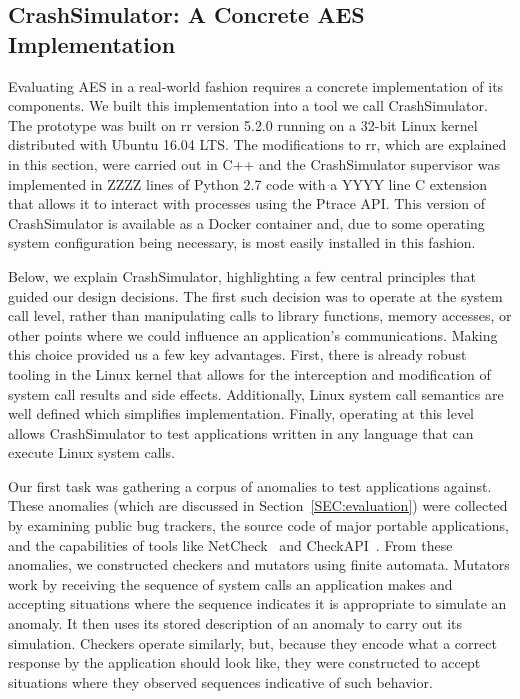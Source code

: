 \subsection{CrashSimulator: A Concrete AES Implementation}
\label{SUBSEC:ApproachCrashSim}
Evaluating AES in a real-world fashion requires a
concrete implementation of its components.
We built this implementation into a tool we call CrashSimulator.  The
prototype was built on rr version 5.2.0 running on a 32-bit Linux kernel
distributed with Ubuntu 16.04 LTS.  The modifications to rr, which are
explained in this section, were carried out in C++ and the CrashSimulator
supervisor was implemented in ZZZZ lines of Python 2.7 code with a YYYY
line C extension that allows it to interact with processes using the Ptrace
API.
This version of CrashSimulator is available as a Docker container and,
due to some operating system configuration being necessary, is most easily
installed in this fashion.

Below, we explain CrashSimulator, highlighting a
few central principles that guided our design decisions. The first such
decision was to operate at the system call level, rather than manipulating
calls to library functions, memory accesses, or other points where we could
influence an application's communications. Making this choice provided us a
few key advantages. First, there is already robust tooling in the Linux
kernel that allows for the interception and modification of system call
results and side effects. Additionally, Linux system call semantics are
well defined which simplifies implementation. Finally, operating at this
level allows CrashSimulator to test applications written in any language
that can execute Linux system calls.

Our first task was
gathering a corpus of anomalies to test applications
against.  These anomalies (which are discussed
in Section~\ref{SEC:evaluation})
were collected by examining public bug trackers,
the source code of major portable applications, and the capabilities of
tools like NetCheck~\cite{Zhuang_NSDI_2014}
and CheckAPI~\cite{rasley2015detecting}.
From these anomalies,
we constructed
checkers and mutators
using finite automata.
Mutators work by receiving the sequence of system calls
an application makes and accepting situations where the sequence indicates
it is appropriate to simulate an anomaly.
It then uses its stored
description of an anomaly
to carry out its simulation.
Checkers operate similarly,
but, because they encode what a
correct response by the application should look like,
they were constructed
to accept situations where they observed sequences indicative of such
behavior.

